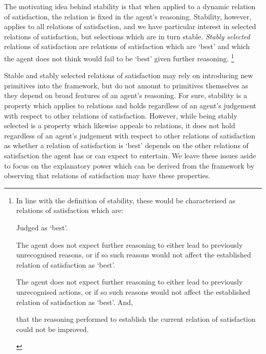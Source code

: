 \documentclass[10pt]{article}
\begin{document}
The motivating idea behind stability is that when applied to a dynamic relation of satisfaction, the relation is fixed in the agent's reasoning.
Stability, however, applies to all relations of satisfaction, and we have particular interest in selected relations of satisfaction, but selections which are in turn stable.
\emph{Stably selected} relations of satisfaction are relations of satisfaction which are `best' and which the agent does not think would fail to be `best' given further reasoning.\nolinebreak
\footnote{In line with the definition of stability, these would be characterised as relations of satisfaction which are:
  \begin{enumerate*}[label=(\arabic*)]
  \item Judged as `best'.
  \item The agent does not expect further reasoning to either lead to previously unrecognised reasons, or if so such reasons would not affect the established relation of satisfaction as `best'.
  \item The agent does not expect further reasoning to either lead to previously unrecognised actions, or if so such reasons would not affect the established relation of satisfaction as `best'.
    And,
  \item that the reasoning performed to establish the current relation of satisfaction could not be improved.
  \end{enumerate*}}

Stable and stably selected relations of satisfaction may rely on introducing new primitives into the framework, but do not amount to primitives themselves as they depend on broad features of an agent's reasoning.
For sure, stability is a property which applies to relations and holds regardless of an agent's judgement with respect to other relations of satisfaction.
However, while being stably selected is a property which likewise appeals to relations, it does not hold regardless of an agent's judgement with respect to other relations of satisfaction as whether a relation of satisfaction is `best' depends on the other relations of satisfaction the agent has or can expect to entertain.
We leave these issues aside to focus on the explanatory power which can be derived from the framework by observing that relations of satisfaction may have these properties.
\end{document}
